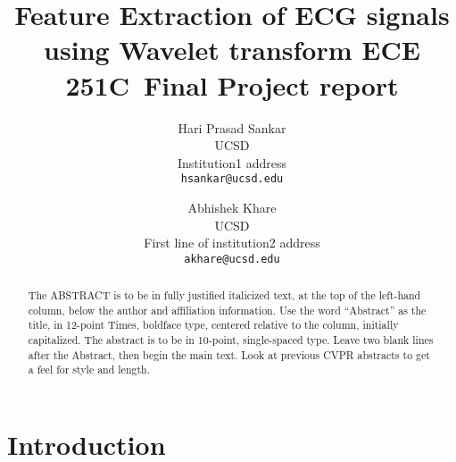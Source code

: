 \documentclass[10pt,twocolumn,letterpaper]{article}
\def\confName{ECE 251C}
\begin{document}
\title{Feature Extraction of ECG signals using Wavelet transform \confName~Final Project report}

\author{Hari Prasad Sankar\\
UCSD\\
Institution1 address\\
{\tt\small hsankar@ucsd.edu}
\and
Abhishek Khare\\
UCSD\\
First line of institution2 address\\
{\tt\small akhare@ucsd.edu}
}
\maketitle

\begin{abstract}
   The ABSTRACT is to be in fully justified italicized text, at the top of the left-hand column, below the author and affiliation information.
   Use the word ``Abstract'' as the title, in 12-point Times, boldface type, centered relative to the column, initially capitalized.
   The abstract is to be in 10-point, single-spaced type.
   Leave two blank lines after the Abstract, then begin the main text.
   Look at previous CVPR abstracts to get a feel for style and length.
\end{abstract}

\section{Introduction}
\label{sec:intro}
\end{document}
